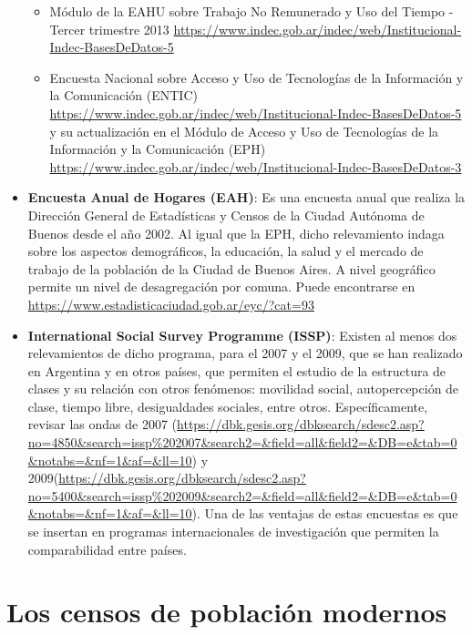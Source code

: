 \documentclass[
]{book}
\providecommand{\tightlist}{%
  \setlength{\itemsep}{0pt}\setlength{\parskip}{0pt}}
\begin{document}
\begin{itemize}
  \begin{itemize}
  \tightlist
  \item
    Módulo de la EAHU sobre Trabajo No Remunerado y Uso del Tiempo - Tercer trimestre 2013 \url{https://www.indec.gob.ar/indec/web/Institucional-Indec-BasesDeDatos-5}\\
  \item
    Encuesta Nacional sobre Acceso y Uso de Tecnologías de la Información y la Comunicación (ENTIC) \url{https://www.indec.gob.ar/indec/web/Institucional-Indec-BasesDeDatos-5} y su actualización en el Módulo de Acceso y Uso de Tecnologías de la Información y la Comunicación (EPH) \url{https://www.indec.gob.ar/indec/web/Institucional-Indec-BasesDeDatos-3}
  \end{itemize}
\item
  \textbf{Encuesta Anual de Hogares (EAH)}: Es una encuesta anual que realiza la Dirección General de Estadísticas y Censos de la Ciudad Autónoma de Buenos desde el año 2002. Al igual que la EPH, dicho relevamiento indaga sobre los aspectos demográficos, la educación, la salud y el mercado de trabajo de la población de la Ciudad de Buenos Aires. A nivel geográfico permite un nivel de desagregación por comuna. Puede encontrarse en \url{https://www.estadisticaciudad.gob.ar/eyc/?cat=93}
\item
  \textbf{International Social Survey Programme (ISSP)}: Existen al menos dos relevamientos de dicho programa, para el 2007 y el 2009, que se han realizado en Argentina y en otros países, que permiten el estudio de la estructura de clases y su relación con otros fenómenos: movilidad social, autopercepción de clase, tiempo libre, desigualdades sociales, entre otros. Específicamente, revisar las ondas de 2007 (\url{https://dbk.gesis.org/dbksearch/sdesc2.asp?no=4850\&search=issp\%202007\&search2=\&field=all\&field2=\&DB=e\&tab=0\&notabs=\&nf=1\&af=\&ll=10}) y 2009(\url{https://dbk.gesis.org/dbksearch/sdesc2.asp?no=5400\&search=issp\%202009\&search2=\&field=all\&field2=\&DB=e\&tab=0\&notabs=\&nf=1\&af=\&ll=10}). Una de las ventajas de estas encuestas es que se insertan en programas internacionales de investigación que permiten la comparabilidad entre países.
\end{itemize}

\hypertarget{fuentes2}{%
\chapter{Los censos de población modernos}\label{fuentes2}}
\end{document}

